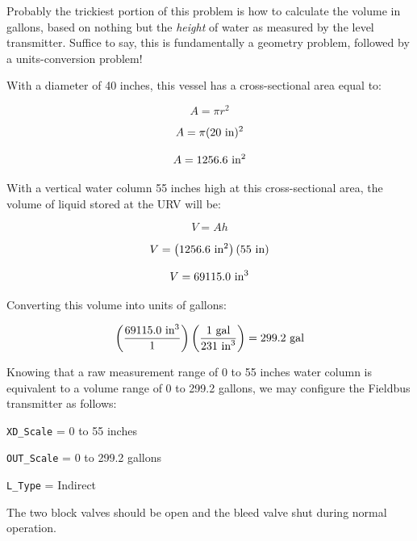





Probably the trickiest portion of this problem is how to calculate the volume in gallons, based on nothing but the {\it height} of water as measured by the level transmitter.  Suffice to say, this is fundamentally a geometry problem, followed by a units-conversion problem!







With a diameter of 40 inches, this vessel has a cross-sectional area equal to:

$$A = \pi r^2$$

$$A = \pi (20 \hbox{ in})^2$$

$$A = 1256.6 \hbox{ in}^2$$

With a vertical water column 55 inches high at this cross-sectional area, the volume of liquid stored at the URV will be:

$$V = A h$$

$$V = \left(1256.6 \hbox{ in}^2\right) (55 \hbox{ in})$$

$$V = 69115.0 \hbox{ in}^3$$

Converting this volume into units of gallons:

$$\left(69115.0 \hbox{ in}^3 \over 1 \right) \left(1 \hbox{ gal} \over 231 \hbox{ in}^3 \right) = 299.2 \hbox{ gal}$$

\vskip 10pt

Knowing that a raw measurement range of 0 to 55 inches water column is equivalent to a volume range of 0 to 299.2 gallons, we may configure the Fieldbus transmitter as follows:

\vskip 10pt

{\tt XD\_Scale} = 0 to 55 inches

\vskip 10pt

{\tt OUT\_Scale} = 0 to 299.2 gallons

\vskip 10pt

{\tt L\_Type} = Indirect

\vskip 10pt

The two block valves should be open and the bleed valve shut during normal operation.





